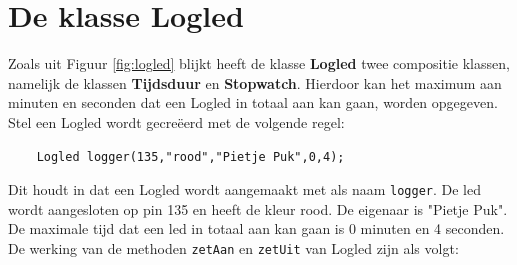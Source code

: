 

\section{De klasse Logled}

Zoals uit Figuur \ref{fig:logled} blijkt heeft de klasse \textbf{Logled} twee compositie klassen, namelijk de klassen \textbf{Tijdsduur} en \textbf{Stopwatch}.
Hierdoor kan het maximum aan minuten en seconden dat een Logled in totaal aan kan gaan, worden opgegeven. Stel een Logled wordt gecreëerd met de volgende regel:
\begin{lstlisting}
	Logled logger(135,"rood","Pietje Puk",0,4);
\end{lstlisting}
Dit houdt in dat een Logled wordt aangemaakt met als naam \texttt{logger}. De led wordt aangesloten op pin 135 en heeft de kleur rood. De eigenaar is "Pietje Puk". De maximale tijd dat een led in totaal aan kan gaan is 0 minuten en 4 seconden.
De werking van de methoden \texttt{zetAan} en \texttt{zetUit} van Logled zijn als volgt:

